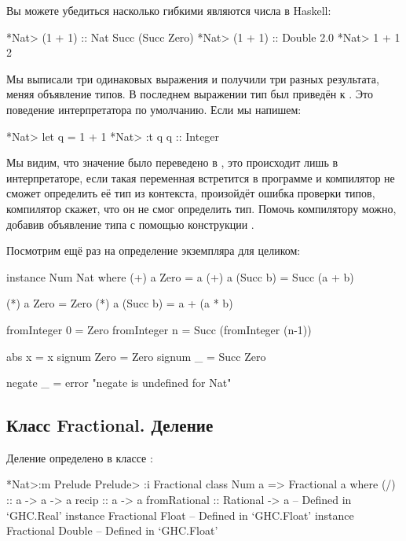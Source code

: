 Вы можете убедиться насколько гибкими являются числа в Haskell:


\begin{code}
*Nat> (1 + 1) :: Nat
Succ (Succ Zero)
*Nat> (1 + 1) :: Double
2.0
*Nat> 1 + 1
2
\end{code}

Мы выписали три одинаковых выражения и получили три разных результата,
меняя объявление типов. В последнем выражении тип был приведён к
. Это поведение интерпретатора по умолчанию. Если мы
напишем:


\begin{code}
*Nat> let q = 1 + 1
*Nat> :t q
q :: Integer
\end{code}

Мы видим, что значение  было переведено в , это
происходит лишь в интерпретаторе, если такая переменная встретится в
программе и компилятор не сможет определить её тип из контекста,
произойдёт ошибка проверки типов, компилятор скажет, что он не смог
определить тип. Помочь компилятору можно, добавив объявление типа с
помощью конструкции .

Посмотрим ещё раз на определение экземпляра  для 
целиком:


\begin{code}
instance Num Nat where
    (+) a Zero     = a
    (+) a (Succ b) = Succ (a + b)

    (*) a Zero     = Zero
    (*) a (Succ b) = a + (a * b)   

    fromInteger 0 = Zero
    fromInteger n = Succ (fromInteger (n-1))

    abs    x    = x 
    signum Zero = Zero
    signum _    = Succ Zero

    negate _ = error "negate is undefined for Nat"
\end{code}

\subsection{Класс Fractional. Деление}

Деление определено в классе :


\begin{code}
*Nat>:m Prelude
Prelude> :i Fractional
class Num a => Fractional a where
  (/) :: a -> a -> a
  recip :: a -> a
  fromRational :: Rational -> a
  	-- Defined in `GHC.Real'
instance Fractional Float -- Defined in `GHC.Float'
instance Fractional Double -- Defined in `GHC.Float'
\end{code}

